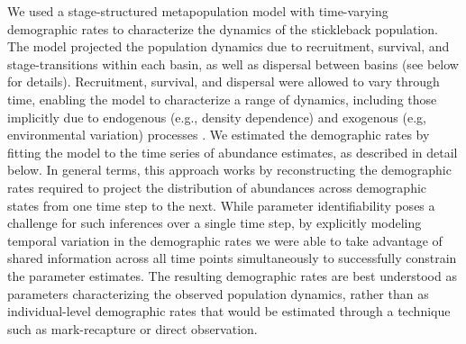 \documentclass[11pt]{article}
\begin{document}
We used a stage-structured metapopulation model \citep{caswell2001matrix}
with time-varying demographic rates
to characterize the dynamics of the stickleback population. 
The model projected the population dynamics due to 
recruitment, survival, and stage-transitions within each basin,
as well as dispersal between basins (see below for details). 
Recruitment, survival, and dispersal were allowed to vary through time,
enabling the model to characterize a range of dynamics, 
including those implicitly due to endogenous (e.g., density dependence) 
and exogenous (e.g, environmental variation) processes
\citep{zeng1998, ives2012}. 
We estimated the demographic rates by  
fitting the model to the time series of abundance estimates,
as described in detail below. 
In general terms, this approach works by reconstructing the demographic rates required
to project the distribution of abundances across demographic states 
from one time step to the next. 
While parameter identifiability poses a challenge for such inferences over a single time
step, by explicitly modeling temporal variation in the demographic rates we were able 
to take advantage of shared information across all time points simultaneously to 
successfully constrain the parameter estimates.
The resulting demographic rates are best understood as parameters 
characterizing the observed population dynamics, 
rather than as individual-level demographic rates that would be estimated through a 
technique such as mark-recapture or direct observation. 
\end{document}
